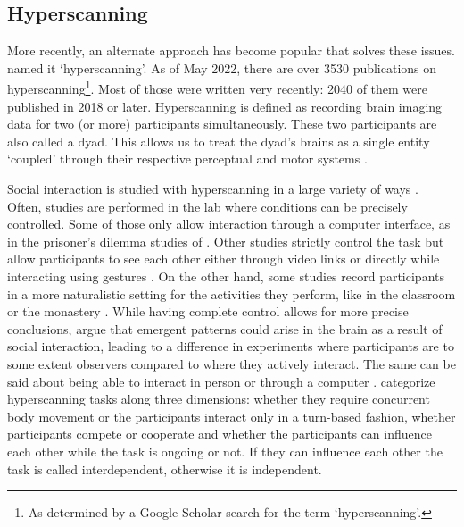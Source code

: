 \subsection{Hyperscanning}

More recently, an alternate approach has become popular that solves these
issues. \textcite{montague_hyperscanning_2002} named it `hyperscanning'. As of
May 2022, there are over 3530 publications on hyperscanning\footnote{As
determined by a Google Scholar search for the term `hyperscanning'.}. Most of
those were written very recently: 2040 of them were published in 2018 or later.
Hyperscanning is defined as recording brain imaging data for two (or more)
participants simultaneously. These two participants are also called a dyad. This
allows us to treat the dyad's brains as a single entity `coupled' through their
respective perceptual and motor systems \parencite{hasson_brain--brain_2012}.

Social interaction is studied with hyperscanning in a large variety of ways
\parencite{czeszumski_hyperscanning_2020}. Often, studies are performed in the
lab where conditions can be precisely controlled. Some of those only allow
interaction through a computer interface, as in the prisoner's dilemma studies
of \textcite{hu_inter-brain_2018,de_vico_fallani_defecting_2010}. Other studies
strictly control the task but allow participants to see each other either
through video links \parencite{dumas_inter-brain_2010,schippers_mapping_2010}
or directly while interacting using gestures
\parencite{yun_interpersonal_2012}. On the other hand, some studies record
participants in a more naturalistic setting for the activities they perform,
like in the classroom \parencite{dikker_brain--brain_2017} or the monastery
\parencite{van_vugt_inter-brain_2020}. While having complete control allows for
more precise conclusions, \textcite{konvalinka_two-brain_2012} argue that
emergent patterns could arise in the brain as a result of social interaction,
leading to a difference in experiments where participants are to some extent
observers \parencite[is a good example; it is difficult to avoid in fMRI
studies]{schippers_mapping_2010} compared to where they actively interact. The
same can be said about being able to interact in person or through a computer
\parencite{konvalinka_two-brain_2012}. \textcite{liu_clarifying_2014} categorize
hyperscanning tasks along three dimensions: whether they require concurrent
body movement or the participants interact only in a turn-based fashion, whether
participants compete or cooperate and whether the participants can influence
each other while the task is ongoing or not. If they can influence each other
the task is called interdependent, otherwise it is independent.

